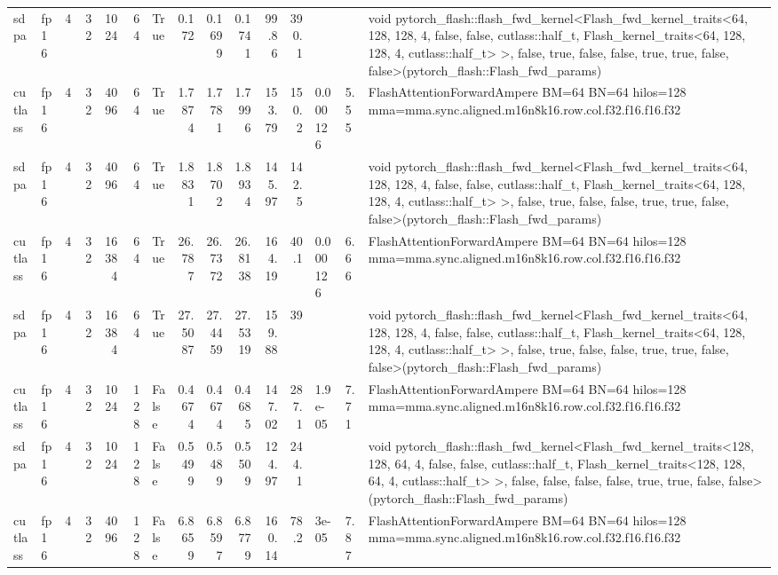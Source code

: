 \begin{table}[htbp]
\begin{tabular}{llrrrrlrrrrrlll}
    sdpa & fp16 & 4 & 32 & 1024 & 64 & True & 0.172 & 0.1699 & 0.1741 & 99.86 & 390.1 &  &  & void pytorch\_flash::flash\_fwd\_kernel<Flash\_fwd\_kernel\_traits<64, 128, 128, 4, false, false, cutlass::half\_t, Flash\_kernel\_traits<64, 128, 128, 4, cutlass::half\_t> >, false, true, false, false, true, true, false, false>(pytorch\_flash::Flash\_fwd\_params) \\
    cutlass & fp16 & 4 & 32 & 4096 & 64 & True & 1.7874 & 1.7781 & 1.7996 & 153.79 & 150.2 & 0.000126 & 5.55 & FlashAttentionForwardAmpere BM=64 BN=64 hilos=128 mma=mma.sync.aligned.m16n8k16.row.col.f32.f16.f16.f32 \\
    sdpa & fp16 & 4 & 32 & 4096 & 64 & True & 1.8831 & 1.8702 & 1.8934 & 145.97 & 142.5 &  &  & void pytorch\_flash::flash\_fwd\_kernel<Flash\_fwd\_kernel\_traits<64, 128, 128, 4, false, false, cutlass::half\_t, Flash\_kernel\_traits<64, 128, 128, 4, cutlass::half\_t> >, false, true, false, false, true, true, false, false>(pytorch\_flash::Flash\_fwd\_params) \\
    cutlass & fp16 & 4 & 32 & 16384 & 64 & True & 26.787 & 26.7372 & 26.8138 & 164.19 & 40.1 & 0.000126 & 6.66 & FlashAttentionForwardAmpere BM=64 BN=64 hilos=128 mma=mma.sync.aligned.m16n8k16.row.col.f32.f16.f16.f32 \\
    sdpa & fp16 & 4 & 32 & 16384 & 64 & True & 27.5087 & 27.4459 & 27.5319 & 159.88 & 39 &  &  & void pytorch\_flash::flash\_fwd\_kernel<Flash\_fwd\_kernel\_traits<64, 128, 128, 4, false, false, cutlass::half\_t, Flash\_kernel\_traits<64, 128, 128, 4, cutlass::half\_t> >, false, true, false, false, true, true, false, false>(pytorch\_flash::Flash\_fwd\_params) \\
    cutlass & fp16 & 4 & 32 & 1024 & 128 & False & 0.4674 & 0.4674 & 0.4685 & 147.02 & 287.1 & 1.9e-05 & 7.71 & FlashAttentionForwardAmpere BM=64 BN=64 hilos=128 mma=mma.sync.aligned.m16n8k16.row.col.f32.f16.f16.f32 \\
    sdpa & fp16 & 4 & 32 & 1024 & 128 & False & 0.5499 & 0.5489 & 0.5509 & 124.97 & 244.1 &  &  & void pytorch\_flash::flash\_fwd\_kernel<Flash\_fwd\_kernel\_traits<128, 128, 64, 4, false, false, cutlass::half\_t, Flash\_kernel\_traits<128, 128, 64, 4, cutlass::half\_t> >, false, false, false, false, true, true, false, false>(pytorch\_flash::Flash\_fwd\_params) \\
    cutlass & fp16 & 4 & 32 & 4096 & 128 & False & 6.8659 & 6.8597 & 6.8779 & 160.14 & 78.2 & 3e-05 & 7.87 & FlashAttentionForwardAmpere BM=64 BN=64 hilos=128 mma=mma.sync.aligned.m16n8k16.row.col.f32.f16.f16.f32 \\

\end{tabular}
\end{table}
